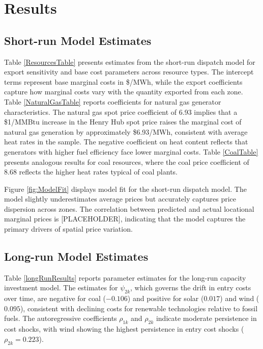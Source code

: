 \documentclass[12pt]{article}
\begin{document}
\section{Results} \label{sec:result}

\subsection{Short-run Model Estimates}

Table \ref{ResourcesTable} presents estimates from the short-run dispatch model for export sensitivity and base cost parameters across resource types. The intercept terms represent base marginal costs in \$/MWh, while the export coefficients capture how marginal costs vary with the quantity exported from each zone. Table \ref{NaturalGasTable} reports coefficients for natural gas generator characteristics. The natural gas spot price coefficient of 6.93 implies that a \$1/MMBtu increase in the Henry Hub spot price raises the marginal cost of natural gas generation by approximately \$6.93/MWh, consistent with average heat rates in the sample. The negative coefficient on heat content reflects that generators with higher fuel efficiency face lower marginal costs. Table \ref{CoalTable} presents analogous results for coal resources, where the coal price coefficient of 8.68 reflects the higher heat rates typical of coal plants.

Figure \ref{fig:ModelFit} displays model fit for the short-run dispatch model. The model slightly underestimates average prices but accurately captures price dispersion across zones. The correlation between predicted and actual locational marginal prices is [PLACEHOLDER], indicating that the model captures the primary drivers of spatial price variation.

\subsection{Long-run Model Estimates}

Table \ref{longRunResults} reports parameter estimates for the long-run capacity investment model. The estimates for $\psi_{2k}$, which governs the drift in entry costs over time, are negative for coal ($-0.106$) and positive for solar ($0.017$) and wind ($0.095$), consistent with declining costs for renewable technologies relative to fossil fuels. The autoregressive coefficients $\rho_{1k}$ and $\rho_{2k}$ indicate moderate persistence in cost shocks, with wind showing the highest persistence in entry cost shocks ($\rho_{2k} = 0.223$).
\end{document}

